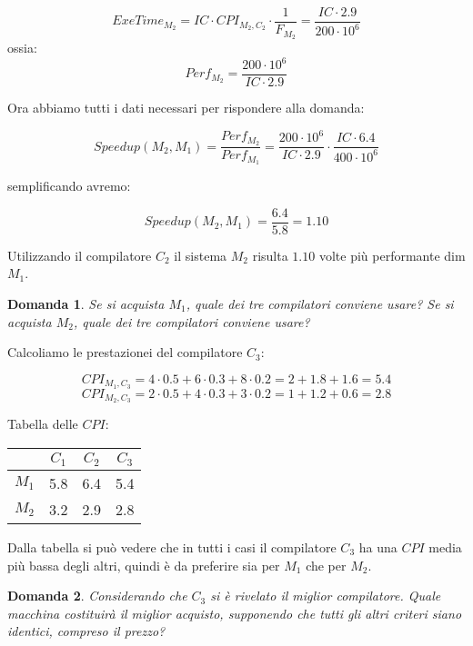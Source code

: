 \documentclass{article}
\newtheorem{domanda}{Domanda}[section]
\begin{document}
    $$ExeTime_{M_2} = IC\cdot CPI_{M_2,C_2} \cdot  \frac{1}{F_{M_{2}}} = \frac{IC\cdot 2.9}{200\cdot 10^{6}}$$
    ossia:
    $$Perf_{M_{2}} = \frac{200\cdot 10^{6}}{IC\cdot 2.9} $$
    
    Ora abbiamo tutti i dati necessari per rispondere alla domanda:
    
    $$Speedup(M_2, M_1) = \frac{Perf_{M_2}}{Perf_{M_1}} = \frac{200\cdot 10^6}{IC\cdot 2.9} \cdot  \frac{IC\cdot 6.4}{400\cdot 10^6}$$
    
    semplificando avremo:
    
    $$Speedup(M_2, M_1) = \frac{6.4}{5.8} = 1.10$$
    
    Utilizzando il compilatore $C_2$ il sistema $M_2$ risulta $1.10$ volte più performante dim $M_1$.   

    \begin{domanda}
    Se si acquista $M_1$, quale dei tre compilatori conviene usare?
    Se si acquista $M_2$, quale dei tre compilatori conviene usare?
    \end{domanda}
    
    Calcoliamo le prestazionei del compilatore $C_3$:
    
    $$CPI_{M_1,C_3} = 4\cdot 0.5 + 6\cdot 0.3 + 8\cdot 0.2 = 2+1.8+1.6 = 5.4$$
    $$CPI_{M_2,C_3} = 2\cdot 0.5 + 4\cdot 0.3 + 3\cdot 0.2 = 1+1.2+0.6 = 2.8$$
    
    Tabella delle $CPI$:


\begin{table}[h!]
\begin{tabular}{l|c|c|c|}
\cline{2-4}
                            & $C_1$ & $C_2$ & $C_3$ \\ \hline
\multicolumn{1}{|l|}{$M_1$} & 5.8   & 6.4   & 5.4   \\ \hline
\multicolumn{1}{|l|}{$M_2$} & 3.2   & 2.9   & 2.8   \\ \hline
\end{tabular}
\end{table}

    Dalla tabella si può vedere che in tutti i casi il compilatore $C_3$ ha una $CPI$ media più bassa degli altri, quindi è da preferire sia per $M_1$ che per $M_2$.
    
    \begin{domanda}
    Considerando che $C_3$ si è rivelato il miglior compilatore. Quale macchina costituirà il miglior acquisto, supponendo che tutti gli altri criteri siano identici, compreso il prezzo?
    \end{domanda}
    
\end{document}
